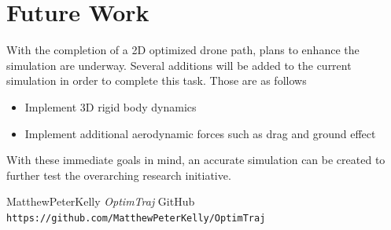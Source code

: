 \documentclass[12pt]{article}
\begin{document}
\section{Future Work}
With the completion of a 2D optimized drone path, plans to enhance the simulation are underway. Several additions will be added to the current simulation in order to complete this task. Those are as follows 
\newline
\begin{itemize}
  \item Implement 3D rigid body dynamics
  \item Implement additional aerodynamic forces such as drag and ground effect
\end{itemize}
With these immediate goals in mind, an accurate simulation can be created to further test the overarching research initiative.
\clearpage
\begin{thebibliography}{9}
MatthewPeterKelly
\textit{OptimTraj}
GitHub
\\\texttt{https://github.com/MatthewPeterKelly/OptimTraj}
\end{thebibliography}

\end{document}
